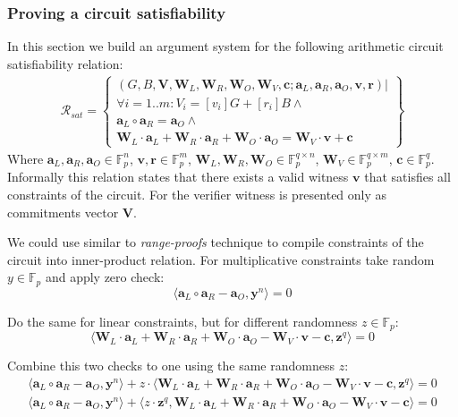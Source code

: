 \documentclass[../lecture-notes-148x210.tex]{subfiles}
\begin{document}
\subsubsection{Proving a circuit satisfiability}
In this section we build an argument system for the following arithmetic circuit satisfiability relation:
\begin{equation}
    \begin{aligned}
        \mathcal{R}_{sat} = \left\{
            \begin{array}{l} 
                (G, B, \mathbf{V}, \mathbf{W}_L, \mathbf{W}_R, \mathbf{W}_O, \mathbf{W}_V, \mathbf{c}; \mathbf{a}_L, \mathbf{a}_R, \mathbf{a}_O, \mathbf{v}, \mathbf{r}) | \\ 
                \forall i=1..m: V_i = [v_i]G + [r_i]B \wedge \\
                \mathbf{a}_L \circ \mathbf{a}_R = \mathbf{a}_O \wedge \\
                \mathbf{W}_L \cdot \mathbf{a}_L + \mathbf{W}_R \cdot \mathbf{a}_R + \mathbf{W}_O \cdot \mathbf{a}_O = \mathbf{W}_V \cdot \mathbf{v} + \mathbf{c}
        \end{array}\right\}
    \end{aligned}
\end{equation}
Where $\mathbf{a}_L, \mathbf{a}_R, \mathbf{a}_O \in \mathbb{F}_p^n$, $\mathbf{v}, \mathbf{r} \in \mathbb{F}_p^m$, $\mathbf{W}_L, \mathbf{W}_R, \mathbf{W}_O \in \mathbb{F}_p^{q \times n}$, $\mathbf{W}_V \in \mathbb{F}_p^{q \times m}$, $\mathbf{c} \in \mathbb{F}_p^q$.
Informally this relation states that there exists a valid witness $\mathbf{v}$ that satisfies all constraints of the circuit. For the verifier witness is presented only as commitments vector $\mathbf{V}$.

We could use similar to \textit{range-proofs} technique to compile constraints of the circuit into inner-product relation. For multiplicative constraints take random $y \in \mathbb{F}_p$ and apply zero check:
$$ \langle \mathbf{a}_L \circ \mathbf{a}_R - \mathbf{a}_O, \mathbf{y}^n \rangle = 0$$

Do the same for linear constraints, but for different randomness $z \in \mathbb{F}_p$:
$$ \langle \mathbf{W}_L \cdot \mathbf{a}_L + \mathbf{W}_R \cdot \mathbf{a}_R + \mathbf{W}_O \cdot \mathbf{a}_O - \mathbf{W}_V \cdot \mathbf{v} - \mathbf{c}, \mathbf{z}^q \rangle = 0$$

Combine this two checks to one using the same randomness $z$:
\begin{equation*}
    \begin{aligned}
        \langle \mathbf{a}_L \circ \mathbf{a}_R - \mathbf{a}_O, \mathbf{y}^n \rangle + z \cdot \langle \mathbf{W}_L \cdot \mathbf{a}_L + \mathbf{W}_R \cdot \mathbf{a}_R + \mathbf{W}_O \cdot \mathbf{a}_O - \mathbf{W}_V \cdot \mathbf{v} - \mathbf{c}, \mathbf{z}^q \rangle = 0 \\
        \langle \mathbf{a}_L \circ \mathbf{a}_R - \mathbf{a}_O, \mathbf{y}^n \rangle + \langle z \cdot \mathbf{z}^q,  \mathbf{W}_L \cdot \mathbf{a}_L + \mathbf{W}_R \cdot \mathbf{a}_R + \mathbf{W}_O \cdot \mathbf{a}_O - \mathbf{W}_V \cdot \mathbf{v} - \mathbf{c} \rangle = 0
    \end{aligned}
\end{equation*}
\end{document}
